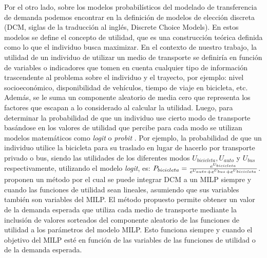   Por el otro lado, sobre los modelos probabilísticos del modelado de transferencia de demanda podemos encontrar en \parencite{ortuz2011} la definición de modelos de elección discreta (DCM, siglas de la traducción al inglés, Discrete Choice Models). En estos modelos se define el concepto de utilidad, que es una construcción teórica definida como lo que el individuo busca maximizar. En el contexto de nuestro trabajo, la utilidad de un individuo de utilizar un medio de transporte se definiría en función de variables o indicadores que tomen en cuenta cualquier tipo de información trascendente al problema sobre el individuo y el trayecto, por ejemplo: nivel socioeconómico, disponibilidad de vehículos, tiempo de viaje en bicicleta, etc. Además, se le suma un componente aleatorio de media cero que representa los factores que escapan a lo considerado al calcular la utilidad. Luego, para determinar la probabilidad de que un individuo use cierto modo de transporte basándose en los valores de utilidad que percibe para cada modo se utilizan modelos matemáticos como {\it logit} o {\it probit} \parencite{ortuz2011}. Por ejemplo, la probabilidad de que un individuo utilice la bicicleta para su traslado en lugar de hacerlo por transporte privado o bus, siendo las utilidades de los diferentes modos $U_{bicicleta}, U_{auto}$ y $U_{bus}$ respectivamente, utilizando el modelo {\it logit}, es: $P_{bicicleta} = {e^{U_{bicicleta}} \over {e^{U_{auto}} + e^{U_{bus}} + e^{U_{bicicleta}}}}$. \textcite{Pacheco2021} proponen un método por el cual se puede integrar DCM a un MILP siempre y cuando las funciones de utilidad sean lineales, asumiendo que sus variables también son variables del MILP. El método propuesto permite obtener un valor de la demanda esperada que utiliza cada medio de transporte mediante la inclusión de valores sorteados del componente aleatorio de las funciones de utilidad a los parámetros del modelo MILP. Esto funciona siempre y cuando el objetivo del MILP esté en función de las variables de las funciones de utilidad o de la demanda esperada.

